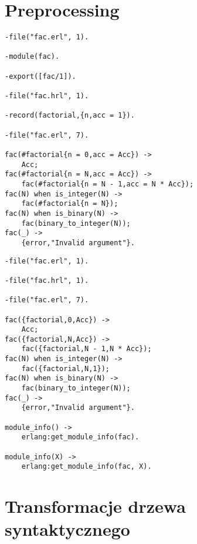 \section{Preprocessing}

\begin{lstlisting}[style=erlang, caption=Moduł fac po pierwszym przetworzeniu, label=facP]
-file("fac.erl", 1).

-module(fac).

-export([fac/1]).

-file("fac.hrl", 1).

-record(factorial,{n,acc = 1}).

-file("fac.erl", 7).

fac(#factorial{n = 0,acc = Acc}) ->
    Acc;
fac(#factorial{n = N,acc = Acc}) ->
    fac(#factorial{n = N - 1,acc = N * Acc});
fac(N) when is_integer(N) ->
    fac(#factorial{n = N});
fac(N) when is_binary(N) ->
    fac(binary_to_integer(N));
fac(_) ->
    {error,"Invalid argument"}.
\end{lstlisting}

\begin{lstlisting}[style=erlang, caption=Moduł fac po drugim przetworzeniu, label=facE]
-file("fac.erl", 1).

-file("fac.hrl", 1).

-file("fac.erl", 7).

fac({factorial,0,Acc}) ->
    Acc;
fac({factorial,N,Acc}) ->
    fac({factorial,N - 1,N * Acc});
fac(N) when is_integer(N) ->
    fac({factorial,N,1});
fac(N) when is_binary(N) ->
    fac(binary_to_integer(N));
fac(_) ->
    {error,"Invalid argument"}.

module_info() ->
    erlang:get_module_info(fac).

module_info(X) ->
    erlang:get_module_info(fac, X).
\end{lstlisting}
\section{Transformacje drzewa syntaktycznego}
\label{sec:compilationSyntaxtree}

